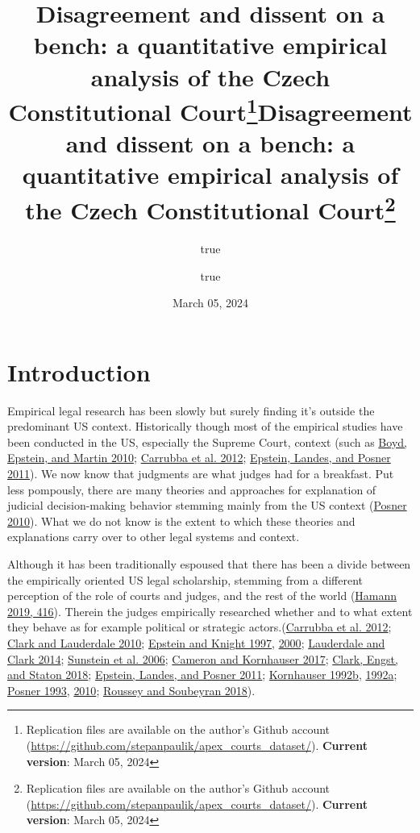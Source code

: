 \documentclass[
  11pt,
]{article}
\title{Disagreement and dissent on a bench: a quantitative empirical
analysis of the Czech Constitutional Court\thanks{Replication files are
available on the author's Github account
(\url{https://github.com/stepanpaulik/apex_courts_dataset/}).
\textbf{Current version}: March 05, 2024}}
\author{true \and true}
\date{March 05, 2024}
\title{Disagreement and dissent on a bench: a quantitative empirical
analysis of the Czech Constitutional Court\thanks{Replication files are
available on the author's Github account
(\url{https://github.com/stepanpaulik/apex_courts_dataset/}).
\textbf{Current version}: March 05, 2024}  }
\date{}
\begin{document}



{
\hypersetup{linkcolor=}
\setcounter{tocdepth}{2}
\tableofcontents
}

\setlength{\parindent}{16pt}
\setlength{\parskip}{0pt}

\doublespacing
\hypertarget{introduction}{%
\section{Introduction}\label{introduction}}

Empirical legal research has been slowly but surely finding it's outside
the predominant US context. Historically though most of the empirical
studies have been conducted in the US, especially the Supreme Court,
context (such as
\protect\hyperlink{ref-boydUntanglingCausalEffects2010}{Boyd, Epstein,
and Martin 2010};
\protect\hyperlink{ref-carrubbaWhoControlsContent2012}{Carrubba et al.
2012}; \protect\hyperlink{ref-epsteinWhyWhenJudges2011}{Epstein, Landes,
and Posner 2011}). We now know that judgments are what judges had for a
breakfast. Put less pompously, there are many theories and approaches
for explanation of judicial decision-making behavior stemming mainly
from the US context
(\protect\hyperlink{ref-posnerHowJudgesThink2010}{Posner 2010}). What we
do not know is the extent to which these theories and explanations carry
over to other legal systems and context.

Although it has been traditionally espoused that there has been a divide
between the empirically oriented US legal scholarship, stemming from a
different perception of the role of courts and judges, and the rest of
the world (\protect\hyperlink{ref-hamannGermanFederalCourts2019}{Hamann
2019, 416}). Therein the judges empirically researched whether and to
what extent they behave as for example political or strategic
actors.(\protect\hyperlink{ref-carrubbaWhoControlsContent2012}{Carrubba
et al. 2012};
\protect\hyperlink{ref-clarkLocatingSupremeCourt2010}{Clark and
Lauderdale 2010};
\protect\hyperlink{ref-epsteinChoicesJusticesMake1997}{Epstein and
Knight 1997},
\protect\hyperlink{ref-epsteinStrategicRevolutionJudicial2000}{2000};
\protect\hyperlink{ref-lauderdaleScalingPoliticallyMeaningful2014}{Lauderdale
and Clark 2014};
\protect\hyperlink{ref-sunsteinAreJudgesPolitical2006}{Sunstein et al.
2006}; \protect\hyperlink{ref-cameronChapterWhatJudges2017}{Cameron and
Kornhauser 2017};
\protect\hyperlink{ref-clarkEstimatingEffectLeisure2018}{Clark, Engst,
and Staton 2018};
\protect\hyperlink{ref-epsteinWhyWhenJudges2011}{Epstein, Landes, and
Posner 2011};
\protect\hyperlink{ref-kornhauserModelingCollegialCourts1992}{Kornhauser
1992b},
\protect\hyperlink{ref-kornhauserModelingCollegialCourts1992a}{1992a};
\protect\hyperlink{ref-posnerWhatJudgesJustices1993}{Posner 1993},
\protect\hyperlink{ref-posnerHowJudgesThink2010}{2010};
\protect\hyperlink{ref-rousseyOverburdenedJudges2018}{Roussey and
Soubeyran 2018}).
\end{document}
